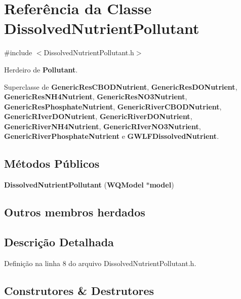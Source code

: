 \section{Referência da Classe Dissolved\+Nutrient\+Pollutant}
\label{class_dissolved_nutrient_pollutant}


{\ttfamily \#include $<$Dissolved\+Nutrient\+Pollutant.\+h$>$}



Herdeiro de {\bf Pollutant}.



Superclasse de {\bf Generic\+Res\+C\+B\+O\+D\+Nutrient}, {\bf Generic\+Res\+D\+O\+Nutrient}, {\bf Generic\+Res\+N\+H4\+Nutrient}, {\bf Generic\+Res\+N\+O3\+Nutrient}, {\bf Generic\+Res\+Phosphate\+Nutrient}, {\bf Generic\+River\+C\+B\+O\+D\+Nutrient}, {\bf Generic\+R\+Iver\+D\+O\+Nutrient}, {\bf Generic\+River\+D\+O\+Nutrient}, {\bf Generic\+River\+N\+H4\+Nutrient}, {\bf Generic\+R\+Iver\+N\+O3\+Nutrient}, {\bf Generic\+River\+Phosphate\+Nutrient} e {\bf G\+W\+L\+F\+Dissolved\+Nutrient}.

\subsection*{Métodos Públicos}
\begin{DoxyCompactItemize}
\item 
{\bf Dissolved\+Nutrient\+Pollutant} ({\bf W\+Q\+Model} $\ast${\bf model})
\end{DoxyCompactItemize}
\subsection*{Outros membros herdados}


\subsection{Descrição Detalhada}


Definição na linha 8 do arquivo Dissolved\+Nutrient\+Pollutant.\+h.



\subsection{Construtores \& Destrutores}
